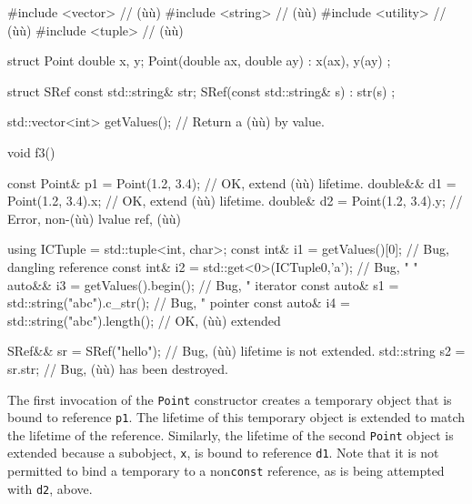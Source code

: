 {{{\begin{emcppslisting}[emcppsbatch=e4]
#include <vector>   // (ù{}ù)
#include <string>   // (ù{}ù)
#include <utility>  // (ù{}ù)
#include <tuple>    // (ù{}ù)

struct Point
{
    double x, y;
    Point(double ax, double ay) : x(ax), y(ay) { }
};

struct SRef
{
    const std::string& str;
    SRef(const std::string& s) : str(s) { }
};

std::vector<int> getValues();  // Return a (ù{}ù) by value.

void f3()
{
    const Point& p1 = Point(1.2, 3.4);    // OK, extend (ù{}ù) lifetime.
    double&&     d1 = Point(1.2, 3.4).x;  // OK, extend (ù{}ù) lifetime.
    double&      d2 = Point(1.2, 3.4).y;  // Error, non-(ù{}ù) lvalue ref, (ù{}ù)

    using ICTuple = std::tuple<int, char>;
    const int&  i1 = getValues()[0];               // Bug, dangling reference
    const int&  i2 = std::get<0>(ICTuple{0,'a'});  // Bug,     "        "
    auto&&      i3 = getValues().begin();          // Bug,     "    iterator
    const auto& s1 = std::string("abc").c_str();   // Bug,     "    pointer
    const auto& i4 = std::string("abc").length();  // OK, (ù{}ù) extended

    SRef&&      sr = SRef("hello");  // Bug, (ù{}ù) lifetime is not extended.
    std::string s2 = sr.str;         // Bug, (ù{}ù) has been destroyed.
}
\end{emcppslisting}


\noindent The first invocation of the \lstinline!Point! constructor creates a
temporary object that is bound to reference \lstinline!p1!. The lifetime of
this temporary object is extended to match the lifetime of the
reference. Similarly, the lifetime of the second \lstinline!Point! object
is extended because a subobject, \lstinline!x!, is bound to reference
\lstinline!d1!. Note that it is not permitted to bind a temporary to a
non\lstinline!const!  reference, as is being attempted with
\lstinline!d2!, above.

}}}
